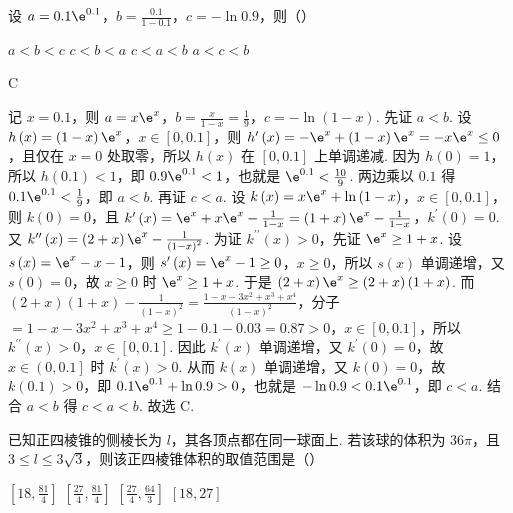 \begin{problem}
设 \(a=0.1\e^{0.1}\)，\(b=\frac{0.1}{1-0.1}\)，\(c=-\ln 0.9\)，则（\quad）

\choices
    {\(a<b<c\)}
    {\(c<b<a\)}
    {\(c<a<b\)}
    {\(a<c<b\)}
\end{problem}

\begin{answer}
C
\end{answer}

\begin{solution}
记 \(x=0.1\)，则 \(a=x\e^{x}\)，\(b=\frac{x}{1-x}=\frac19\)，\(c=-\ln\left(1-x\right)\). 先证 \(a<b\). 设 \(h\left(x\right)=\left(1-x\right)\e^{x}\)，\(x\in\left[0,0.1\right]\)，则 \(h^{\prime}\left(x\right)=-\e^{x}+\left(1-x\right)\e^{x}=-x\e^{x}\le 0\)，且仅在 \(x=0\) 处取零，所以 \(h\left(x\right)\) 在 \(\left[0,0.1\right]\) 上单调递减. 因为 \(h\left(0\right)=1\)，所以 \(h\left(0.1\right)<1\)，即 \(0.9\e^{0.1}<1\)，也就是 \(\e^{0.1}<\frac{10}{9}\). 两边乘以 \(0.1\) 得 \(0.1\e^{0.1}<\frac19\)，即 \(a<b\). 再证 \(c<a\). 设 \(k\left(x\right)=x\e^{x}+\ln\left(1-x\right)\)，\(x\in\left[0,0.1\right]\)，则 \(k\left(0\right)=0\)，且 \(k^{\prime}\left(x\right)=\e^{x}+x\e^{x}-\frac{1}{1-x}=\left(1+x\right)\e^{x}-\frac{1}{1-x}\)，\(k^{\prime}\left(0\right)=0\). 又 \(k^{\prime\prime}\left(x\right)=\left(2+x\right)\e^{x}-\frac{1}{\left(1-x\right)^2}\). 为证 \(k^{\prime\prime}\left(x\right)>0\)，先证 \(\e^{x}\ge 1+x\). 设 \(s\left(x\right)=\e^{x}-x-1\)，则 \(s^{\prime}\left(x\right)=\e^{x}-1\ge 0\)，\(x\ge 0\)，所以 \(s\left(x\right)\) 单调递增，又 \(s\left(0\right)=0\)，故 \(x\ge 0\) 时 \(\e^{x}\ge 1+x\). 于是 \(\left(2+x\right)\e^{x}\ge \left(2+x\right)\left(1+x\right)\). 而 \(\left(2+x\right)\left(1+x\right)-\frac{1}{\left(1-x\right)^2}=\frac{1-x-3x^2+x^3+x^4}{\left(1-x\right)^2}\)，分子 \(=1-x-3x^2+x^3+x^4\ge 1-0.1-0.03=0.87>0\)，\(x\in\left[0,0.1\right]\)，所以 \(k^{\prime\prime}\left(x\right)>0\)，\(x\in\left[0,0.1\right]\). 因此 \(k^{\prime}\left(x\right)\) 单调递增，又 \(k^{\prime}\left(0\right)=0\)，故 \(x\in\left(0,0.1\right]\) 时 \(k^{\prime}\left(x\right)>0\). 从而 \(k\left(x\right)\) 单调递增，又 \(k\left(0\right)=0\)，故 \(k\left(0.1\right)>0\)，即 \(0.1\e^{0.1}+\ln 0.9>0\)，也就是 \(-\ln 0.9<0.1\e^{0.1}\)，即 \(c<a\). 结合 \(a<b\) 得 \(c<a<b\). 故选 C.
\end{solution}

\begin{problem}
已知正四棱锥的侧棱长为 \(l\)，其各顶点都在同一球面上. 若该球的体积为 \(36\pi\)，且 \(3\le l\le 3\sqrt3\)，则该正四棱锥体积的取值范围是（\quad）

\choices
    {\(\left[18,\frac{81}{4}\right]\)}
    {\(\left[\frac{27}{4},\frac{81}{4}\right]\)}
    {\(\left[\frac{27}{4},\frac{64}{3}\right]\)}
    {\([18,27]\)}
\end{problem}

